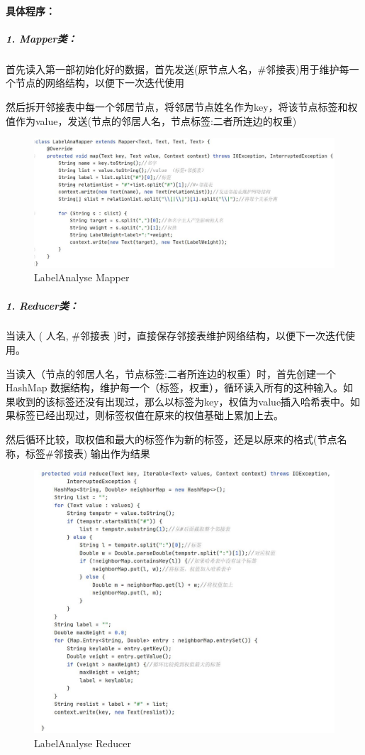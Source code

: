 \documentclass[a4paper,UTF8]{article}
\numberwithin{equation}{section}
\begin{document}
\paragraph{具体程序：}
\subparagraph{1. Mapper类：}
\par 首先读入第一部初始化好的数据，首先发送(原节点人名，\#邻接表)用于维护每一个节点的网络结构，以便下一次迭代使用
\par 然后拆开邻接表中每一个邻居节点，将邻居节点姓名作为key，将该节点标签和权值作为value，发送(节点的邻居人名，节点标签:二者所连边的权重)
\begin{figure}[H]
    \centering

    \includegraphics[width = 15cm]{5-2MAPPER.jpg}

    \caption{LabelAnalyse Mapper}
\end{figure}
\subparagraph{1. Reducer类：}
\par 当读入 ( 人名, \#邻接表 )时，直接保存邻接表维护网络结构，以便下一次迭代使用。
\par 当读入（节点的邻居人名，节点标签:二者所连边的权重）时，首先创建一个HashMap 数据结构，维护每一个（标签，权重），循环读入所有的这种输入。如果收到的该标签还没有出现过，那么以标签为key，权值为value插入哈希表中。如果标签已经出现过，则标签权值在原来的权值基础上累加上去。
\par 然后循环比较，取权值和最大的标签作为新的标签，还是以原来的格式(节点名称，标签\#邻接表) 输出作为结果
\begin{figure}[H]
    \centering

    \includegraphics[width = 15cm]{5-2reducer.jpg}

    \caption{LabelAnalyse Reducer}
\end{figure}
\end{document}
